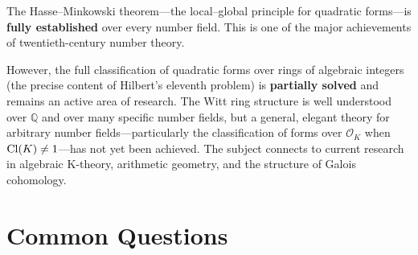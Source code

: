 \begin{partiallybox}
The Hasse--Minkowski theorem---the local--global principle for quadratic forms---is \textbf{fully established} over every number field. This is one of the major achievements of twentieth-century number theory.

However, the full classification of quadratic forms over rings of algebraic integers (the precise content of Hilbert's eleventh problem) is \textbf{partially solved} and remains an active area of research. The Witt ring structure is well understood over $\mathbb{Q}$ and over many specific number fields, but a general, elegant theory for arbitrary number fields---particularly the classification of forms over $\mathcal{O}_K$ when $\operatorname{Cl}(K) \neq 1$---has not yet been achieved. The subject connects to current research in algebraic K-theory, arithmetic geometry, and the structure of Galois cohomology.
\end{partiallybox}

\section*{Common Questions}

